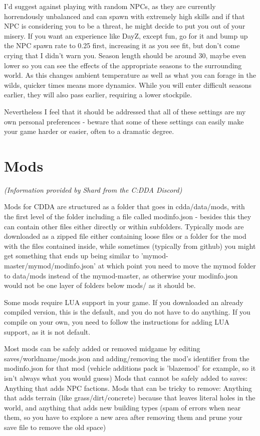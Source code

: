 I'd suggest against playing with random NPCs, as they are currently horrendously unbalanced and can spawn with extremely high skills and if that NPC is considering you to be a threat, he might decide to put you out of your misery. If you want an experience like DayZ, except fun, go for it and bump up the NPC spawn rate to 0.25 first, increasing it as you see fit, but don't come crying that I didn't warn you.
Season length should be around 30, maybe even lower so you can see the effects of the appropriate seasons to the surrounding world. As this changes ambient temperature as well as what you can forage in the wilds, quicker times means more dynamics. While you will enter difficult seasons earlier, they will also pass earlier, requiring a lower stockpile.

Nevertheless I feel that it should be addressed that all of these settings are my own personal preferences - beware that some of these settings can easily make your game harder or easier, often to a dramatic degree.

\section{Mods}

\textit{(Information provided by Shard from the C:DDA Discord)}

Mods for CDDA are structured as a folder that goes in cdda/data/mods, with the first level of the folder including a file called modinfo.json - besides this they can contain other files either directly or within subfolders.  Typically mods are downloaded as a zipped file either containing loose files or a folder for the mod with the files contained inside, while sometimes (typically from github) you might get something that ends up being similar to 'mymod-master/mymod/modinfo.json' at which point you need to move the mymod folder to data/mods instead of the mymod-master, as otherwise your modinfo.json would not be one layer of folders below mods/ as it should be.

Some mods require LUA support in your game.  If you downloaded an already compiled version, this is the default, and you do not have to do anything.  If you compile on your own, you need to follow the instructions for adding LUA support, as it is not default.

Most mods can be safely added or removed midgame by editing saves/worldname/mods.json and adding/removing the mod's identifier from the modinfo.json for that mod (vehicle additions pack is 'blazemod' for example, so it isn't always what you would guess)  Mods that cannot be safely added to saves: Anything that adds NPC factions.  Mods that can be tricky to remove: Anything that adds terrain (like grass/dirt/concrete) because that leaves literal holes in the world, and anything that adds new building types (spam of errors when near them, so you have to explore a new area after removing them and prune your save file to remove the old space)

